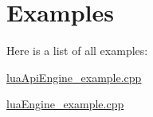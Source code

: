 \section{Examples}
Here is a list of all examples\-:\begin{DoxyCompactItemize}
\item 
\hyperlink{lua_api_engine_example_8cpp-example}{lua\-Api\-Engine\-\_\-example.\-cpp}
\item 
\hyperlink{lua_engine_example_8cpp-example}{lua\-Engine\-\_\-example.\-cpp}
\end{DoxyCompactItemize}
